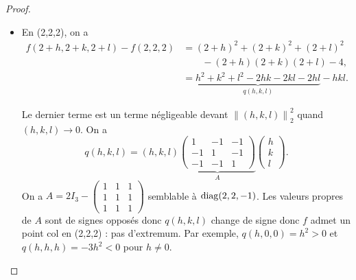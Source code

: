 \documentclass[12pt]{article}
\begin{document}
\begin{proof}
\begin{itemize}
		\item En (2,2,2), on a 
		\begin{align}
			f(2+h,2+k,2+l)-f(2,2,2)
			&=(2+h)^{2}+(2+k)^{2}+(2+l)^{2}\\
			&\qquad-(2+h)(2+k)(2+l)-4,\nonumber\\
			&=\underbrace{h^{2}+k^{2}+l^{2}-2hk-2kl-2hl}_{q(h,k,l)}-hkl.
		\end{align}

		Le dernier terme est un terme négligeable devant $\left\lVert (h,k,l)\right\rVert_{2}^{2}$ quand $(h,k,l)\to0$.
		On a 
		\begin{equation}
			q(h,k,l)=(h,k,l)\underbrace{\begin{pmatrix}
				1&-1&-1\\-1&1&-1\\-1&-1&1
			\end{pmatrix}}_{A}\begin{pmatrix}
				h\\k\\l
			\end{pmatrix}.
		\end{equation}
		On a $A=2I_{3}-\begin{pmatrix}
			1&1&1\\1&1&1\\1&1&1
		\end{pmatrix}$ semblable à $\operatorname{diag}(2,2,-1)$. Les valeurs propres de $A$ sont de signes opposés donc $q(h,k,l)$ change de signe donc $f$ admet un point col en (2,2,2) : pas d'extremum. Par exemple, $q(h,0,0)=h^{2}>0$ et $q(h,h,h)=-3h^{2}<0$ pour $h\neq0$.
	\end{itemize}
\end{proof}
\end{document}
